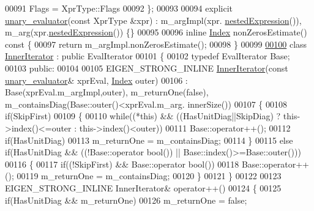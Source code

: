 \begin{DoxyCode}
00091     Flags = XprType::Flags
00092   \};
00093     
00094   \textcolor{keyword}{explicit} \hyperlink{struct_eigen_1_1internal_1_1unary__evaluator}{unary\_evaluator}(\textcolor{keyword}{const} XprType &xpr) : m\_argImpl(xpr.
      \hyperlink{group___core___module_a83b7cdd9d9ea543a3c893fc2e74d8fbb}{nestedExpression}()), m\_arg(xpr.\hyperlink{group___core___module_a83b7cdd9d9ea543a3c893fc2e74d8fbb}{nestedExpression}()) \{\}
00095   
00096   \textcolor{keyword}{inline} \hyperlink{namespace_eigen_a62e77e0933482dafde8fe197d9a2cfde}{Index} nonZerosEstimate()\textcolor{keyword}{ const }\{
00097     \textcolor{keywordflow}{return} m\_argImpl.nonZerosEstimate();
00098   \}
00099   
\hyperlink{class_eigen_1_1internal_1_1unary__evaluator_3_01_triangular_view_3_01_arg_type_00_01_mode_01_4_0e8ca4efc3cb45e07bfa597fdc256f969}{00100}   \textcolor{keyword}{class }\hyperlink{class_eigen_1_1_inner_iterator}{InnerIterator} : \textcolor{keyword}{public} EvalIterator
00101   \{
00102       \textcolor{keyword}{typedef} EvalIterator Base;
00103     \textcolor{keyword}{public}:
00104 
00105       EIGEN\_STRONG\_INLINE \hyperlink{class_eigen_1_1_inner_iterator}{InnerIterator}(\textcolor{keyword}{const} \hyperlink{struct_eigen_1_1internal_1_1unary__evaluator}{unary\_evaluator}& xprEval, 
      \hyperlink{namespace_eigen_a62e77e0933482dafde8fe197d9a2cfde}{Index} outer)
00106         : Base(xprEval.m\_argImpl,outer), m\_returnOne(\textcolor{keyword}{false}), m\_containsDiag(Base::outer()<xprEval.m\_arg.
      innerSize())
00107       \{
00108         \textcolor{keywordflow}{if}(SkipFirst)
00109         \{
00110           \textcolor{keywordflow}{while}((*\textcolor{keyword}{this}) && ((HasUnitDiag||SkipDiag)  ? this->index()<=outer : this->index()<outer))
00111             Base::operator++();
00112           \textcolor{keywordflow}{if}(HasUnitDiag)
00113             m\_returnOne = m\_containsDiag;
00114         \}
00115         \textcolor{keywordflow}{else} \textcolor{keywordflow}{if}(HasUnitDiag && ((!Base::operator \textcolor{keywordtype}{bool}()) || Base::index()>=Base::outer()))
00116         \{
00117           \textcolor{keywordflow}{if}((!SkipFirst) && Base::operator \textcolor{keywordtype}{bool}())
00118             Base::operator++();
00119           m\_returnOne = m\_containsDiag;
00120         \}
00121       \}
00122 
00123       EIGEN\_STRONG\_INLINE InnerIterator& operator++()
00124       \{
00125         \textcolor{keywordflow}{if}(HasUnitDiag && m\_returnOne)
00126           m\_returnOne = \textcolor{keyword}{false};

\end{DoxyCode}
